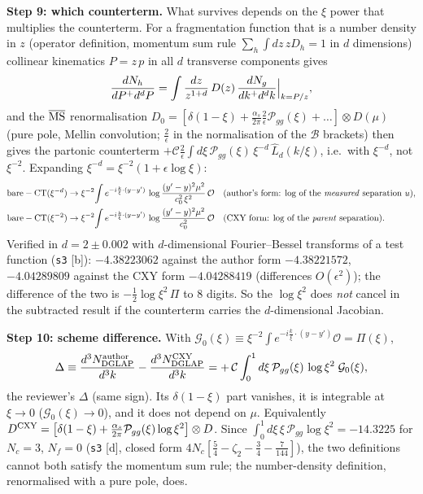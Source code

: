 \documentclass[10pt]{article}
\begin{document}
\medskip
\noindent\textbf{Step 9: which counterterm.} What survives depends on the $\xi$ power that multiplies the counterterm. For a fragmentation function that is a number density in $z$ (operator definition, momentum sum rule $\sum_{h}\int dz\,zD_{h}=1$ in $d$ dimensions) collinear kinematics $P=z\,p$ in all $d$ transverse components gives
\begin{align}
\frac{dN_{h}}{dP^{+}d^{d}P}=\int\frac{dz}{z^{1+d}}\,D(z)\,\frac{dN_{g}}{dk^{+}d^{d}k}\Big|_{k=P/z},
\notag
\end{align}
and the $\overline{\rm MS}$ renormalisation $D_{0}=[\delta(1-\xi)+\frac{\alpha_{s}}{2\pi}\frac{2}{\epsilon}\mathcal{P}_{gg}(\xi)+\dots]\otimes D(\mu)$ (pure pole, Mellin convolution; $\frac{2}{\epsilon}$ in the normalisation of the $\mathcal{B}$ brackets) then gives the partonic counterterm $+\mathcal{C}\frac{2}{\epsilon}\int d\xi\,\mathcal{P}_{gg}(\xi)\,\xi^{-d}\,\widehat{L}_{d}(k/\xi)$, i.e.\ with $\xi^{-d}$, not $\xi^{-2}$. Expanding $\xi^{-d}=\xi^{-2}(1+\epsilon\log\xi)$:
\begin{align}
\text{bare}-\text{CT}(\xi^{-d})&\to\xi^{-2}\!\int e^{-i\frac{k}{\xi}\cdot(y-y')}\,\log\frac{(y'-y)^{2}\mu^{2}}{c_{0}^{2}\,\xi^{2}}\,\mathcal{O}\quad\text{(author's form: log of the \emph{measured} separation $u$)},\notag\\
\text{bare}-\text{CT}(\xi^{-2})&\to\xi^{-2}\!\int e^{-i\frac{k}{\xi}\cdot(y-y')}\,\log\frac{(y'-y)^{2}\mu^{2}}{c_{0}^{2}}\,\mathcal{O}\quad\text{(CXY form: log of the \emph{parent} separation)}.
\label{eq:pd-two}
\end{align}
Verified in $d=2\pm0.002$ with $d$-dimensional Fourier--Bessel transforms of a test function (\texttt{s3} [b]): $-4.38223062$ against the author form $-4.38221572$, $-4.04289809$ against the CXY form $-4.04288419$ (differences $O(\epsilon^{2})$); the difference of the two is $-\frac12\log\xi^{2}\,\Pi$ to 8 digits. So the $\log\xi^{2}$ does \emph{not} cancel in the subtracted result if the counterterm carries the $d$-dimensional Jacobian.

\medskip
\noindent\textbf{Step 10: scheme difference.} With $\mathcal{G}_{0}(\xi)\equiv\xi^{-2}\int e^{-i\frac{k}{\xi}\cdot(y-y')}\mathcal{O}=\Pi(\xi)$,
\begin{align}
\Delta\equiv\frac{d^{3}N_{\rm DGLAP}^{\rm author}}{d^{3}k}-\frac{d^{3}N_{\rm DGLAP}^{\rm CXY}}{d^{3}k}=+\,\mathcal{C}\int_{0}^{1}d\xi\,\mathcal{P}_{gg}(\xi)\,\log\xi^{2}\;\mathcal{G}_{0}(\xi),
\label{eq:pd-Delta}
\end{align}
the reviewer's $\Delta$ (same sign). Its $\delta(1-\xi)$ part vanishes, it is integrable at $\xi\to0$ ($\mathcal{G}_{0}(\xi)\to0$), and it does not depend on $\mu$. Equivalently $D^{\rm CXY}=\big[\delta(1-\xi)+\frac{\alpha_{s}}{2\pi}\mathcal{P}_{gg}(\xi)\log\xi^{2}\big]\otimes D$. Since $\int_{0}^{1}d\xi\,\xi\,\mathcal{P}_{gg}\log\xi^{2}=-14.3225$ for $N_{c}=3$, $N_{f}=0$ (\texttt{s3} [d], closed form $4N_{c}[\frac54-\zeta_{2}-\frac34-\frac{7}{144}]$), the two definitions cannot both satisfy the momentum sum rule; the number-density definition, renormalised with a pure pole, does.
\end{document}
